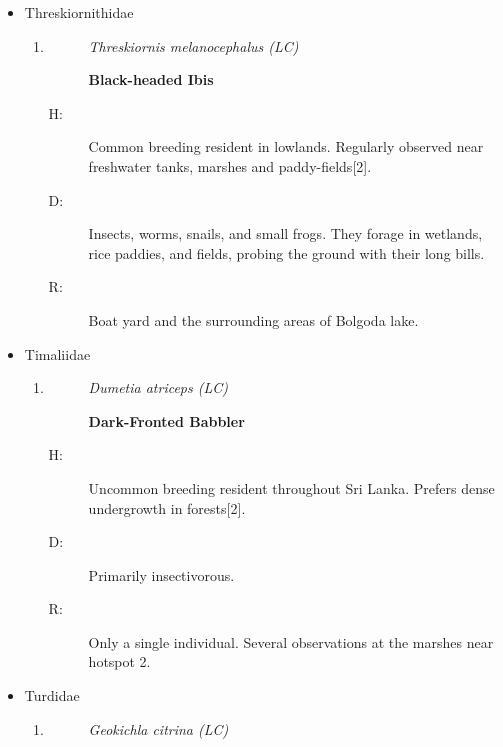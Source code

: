 \begin{itemize}
\begin{enumerate}
\begin{description}
\item[R: ]%
Single sighting at Hotspot 2.%
\end{description}%
\end{enumerate}%
\item%
Threskiornithidae%
\begin{enumerate}%
\item%
\begin{description}%
\item[]%
\textit{Threskiornis melanocephalus (LC)}%
\item[]%
\textbf{Black{-}headed Ibis}%
\end{description}%
\begin{description}%
\item[H: ]%
Common breeding resident in lowlands. Regularly observed near freshwater tanks, marshes and paddy-fields{[}2{]}.%
\item[D: ]%
Insects, worms, snails, and small frogs. They forage in wetlands, rice paddies, and fields, probing the ground with their long bills.%
\item[R: ]%
Boat yard and the surrounding areas of Bolgoda lake.%
\end{description}%
\end{enumerate}%
\item%
Timaliidae%
\begin{enumerate}%
\item%
\begin{description}%
\item[]%
\textit{Dumetia atriceps (LC)}%
\item[]%
\textbf{Dark{-}Fronted Babbler}%
\end{description}%
\begin{description}%
\item[H: ]%
Uncommon breeding resident throughout Sri Lanka. Prefers dense undergrowth in forests{[}2{]}.%
\item[D: ]%
Primarily insectivorous.%
\item[R: ]%
Only a single individual. Several observations at the marshes near hotspot 2.%
\end{description}%
\end{enumerate}%
\item%
Turdidae%
\begin{enumerate}%
\item%
\begin{description}%
\item[]%
\textit{Geokichla citrina (LC)}%
\item[]%

\end{description}
\end{enumerate}
\end{itemize}
